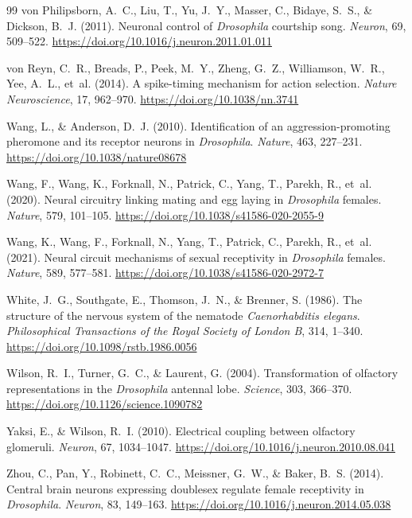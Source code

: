 \documentclass[11pt,a4paper]{article}
\begin{document}
\begin{thebibliography}{99}
von Philipsborn, A.~C., Liu, T., Yu, J.~Y., Masser, C., Bidaye, S.~S., \& Dickson, B.~J. (2011). Neuronal control of \emph{Drosophila} courtship song. \emph{Neuron}, 69, 509--522. \url{https://doi.org/10.1016/j.neuron.2011.01.011}

von Reyn, C.~R., Breads, P., Peek, M.~Y., Zheng, G.~Z., Williamson, W.~R., Yee, A.~L., et~al. (2014). A spike-timing mechanism for action selection. \emph{Nature Neuroscience}, 17, 962--970. \url{https://doi.org/10.1038/nn.3741}

Wang, L., \& Anderson, D.~J. (2010). Identification of an aggression-promoting pheromone and its receptor neurons in \emph{Drosophila}. \emph{Nature}, 463, 227--231. \url{https://doi.org/10.1038/nature08678}

Wang, F., Wang, K., Forknall, N., Patrick, C., Yang, T., Parekh, R., et~al. (2020). Neural circuitry linking mating and egg laying in \emph{Drosophila} females. \emph{Nature}, 579, 101--105. \url{https://doi.org/10.1038/s41586-020-2055-9}

Wang, K., Wang, F., Forknall, N., Yang, T., Patrick, C., Parekh, R., et~al. (2021). Neural circuit mechanisms of sexual receptivity in \emph{Drosophila} females. \emph{Nature}, 589, 577--581. \url{https://doi.org/10.1038/s41586-020-2972-7}

White, J.~G., Southgate, E., Thomson, J.~N., \& Brenner, S. (1986). The structure of the nervous system of the nematode \emph{Caenorhabditis elegans}. \emph{Philosophical Transactions of the Royal Society of London B}, 314, 1--340. \url{https://doi.org/10.1098/rstb.1986.0056}

Wilson, R.~I., Turner, G.~C., \& Laurent, G. (2004). Transformation of olfactory representations in the \emph{Drosophila} antennal lobe. \emph{Science}, 303, 366--370. \url{https://doi.org/10.1126/science.1090782}

Yaksi, E., \& Wilson, R.~I. (2010). Electrical coupling between olfactory glomeruli. \emph{Neuron}, 67, 1034--1047. \url{https://doi.org/10.1016/j.neuron.2010.08.041}

Zhou, C., Pan, Y., Robinett, C.~C., Meissner, G.~W., \& Baker, B.~S. (2014). Central brain neurons expressing doublesex regulate female receptivity in \emph{Drosophila}. \emph{Neuron}, 83, 149--163. \url{https://doi.org/10.1016/j.neuron.2014.05.038}

\end{thebibliography}
\end{document}
